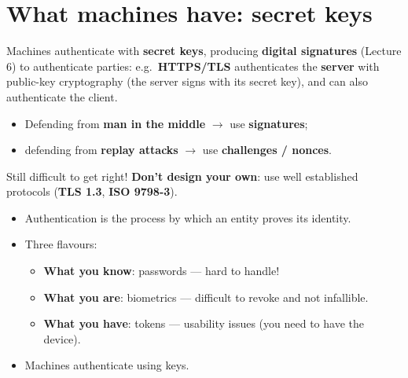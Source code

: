 \section{What machines have: secret keys}

\begin{defnbox}[title=Machine authentication]
Machines authenticate with \textbf{secret keys}, producing \textbf{digital signatures} (Lecture 6)
to authenticate parties: e.g.\ \textbf{HTTPS/TLS} authenticates the \textbf{server} with
public-key cryptography (the server signs with its secret key), and can also authenticate the
client.
\end{defnbox}

\begin{keybox}[title={Building authentication protocols is hard!}]
\begin{itemize}
  \item Defending from \textbf{man in the middle} $\to$ use \textbf{signatures};
  \item defending from \textbf{replay attacks} $\to$ use \textbf{challenges / nonces}.
\end{itemize}
Still difficult to get right! \textbf{Don't design your own}: use well established protocols
(\textbf{TLS 1.3}, \textbf{ISO 9798-3}).
\end{keybox}

\begin{keybox}[title=Summary of the lecture]
\begin{itemize}
  \item Authentication is the process by which an entity proves its identity.
  \item Three flavours:
        \begin{itemize}
          \item \textbf{What you know}: passwords --- hard to handle!
          \item \textbf{What you are}: biometrics --- difficult to revoke and not infallible.
          \item \textbf{What you have}: tokens --- usability issues (you need to have the device).
        \end{itemize}
  \item Machines authenticate using keys.
\end{itemize}
\end{keybox}
